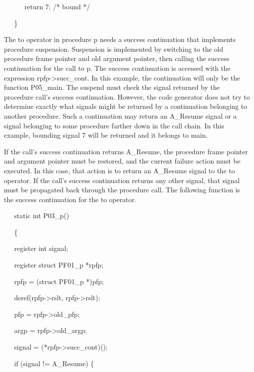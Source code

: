 {\ttfamily\mdseries
\ \ \ \ \ \ return 7; /* bound */}

{\ttfamily\mdseries
\ \ \ \}}


The to operator in procedure p needs a success continuation that
implements procedure suspension. Suspension is implemented by
switching to the old procedure frame pointer and old argument pointer,
then calling the success continuation for the call to p. The success
continuation is accessed with the expression
rpfp-{\textgreater}succ\_cont.  In this example, the continuation will
only be the function P05\_main. The suspend must check the signal
returned by the procedure call's success continuation. However, the
code generator does not try to determine exactly what signals might be
returned by a continuation belonging to another procedure. Such a
continuation may return an A\_Resume signal or a signal belonging to
some procedure farther down in the call chain. In this example,
bounding signal 7 will be returned and it belongs to main.

If the call's success continuation returns A\_Resume, the procedure
frame pointer and argument pointer must be restored, and the current
failure action must be executed. In this case, that action is to
return an A\_Resume signal to the to operator. If the call's success
continuation returns any other signal, that signal must be propagated
back through the procedure call. The following function is the success
continuation for the to operator.

{\ttfamily\mdseries
\ \ \ static int P03\_p()}

{\ttfamily\mdseries
\ \ \ \{}

{\ttfamily\mdseries
\ \ \ register int signal;}

{\ttfamily\mdseries
\ \ \ register struct PF01\_p *rpfp;}


\bigskip

{\ttfamily\mdseries
\ \ \ rpfp = (struct PF01\_p *)pfp;}

{\ttfamily\mdseries
\ \ \ deref(rpfp-{\textgreater}rslt, rpfp-{\textgreater}rslt);}

{\ttfamily\mdseries
\ \ \ pfp = rpfp-{\textgreater}old\_pfp;}

{\ttfamily\mdseries
\ \ \ argp = rpfp-{\textgreater}old\_argp;}


\bigskip

{\ttfamily\mdseries
\ \ \ signal = (*rpfp-{\textgreater}succ\_cont)();}

{\ttfamily\mdseries
\ \ \ if (signal != A\_Resume) \{}

